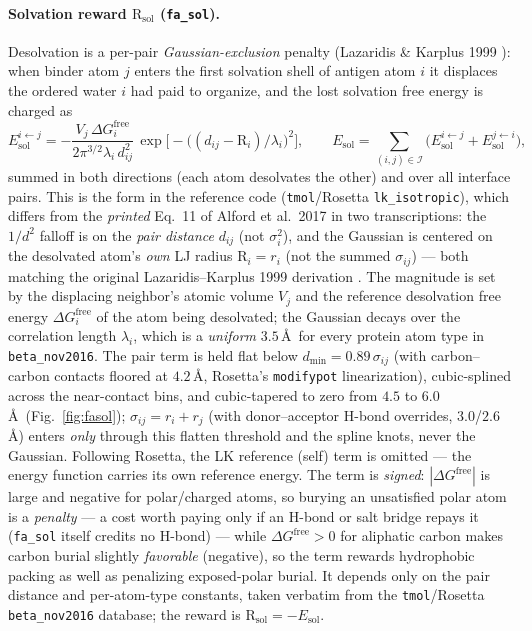 \documentclass[11pt]{article}
\newcommand{\R}{\mathrm{R}}
\newcommand{\ttk}[1]{\texttt{\small #1}}
\begin{document}
\paragraph{Solvation reward $\R_{\mathrm{sol}}$ (\ttk{fa\_sol}).} Desolvation is a per-pair
\emph{Gaussian-exclusion} penalty (Lazaridis \& Karplus 1999 \cite{lk1999}): when binder atom $j$
enters the first solvation shell of antigen atom $i$ it displaces the ordered water $i$ had paid to
organize, and the lost solvation free energy is charged as
\begin{equation}
E^{i\leftarrow j}_{\mathrm{sol}}=-\frac{V_j\,\Delta G^{\mathrm{free}}_i}
   {2\pi^{3/2}\lambda_i\,d_{ij}^{2}}\,
   \exp\!\Big[-\big((d_{ij}-\R_i)/\lambda_i\big)^{2}\Big],
\qquad
E_{\mathrm{sol}}=\!\!\sum_{(i,j)\in\mathcal I}\!\big(E^{i\leftarrow j}_{\mathrm{sol}}+E^{j\leftarrow i}_{\mathrm{sol}}\big),
\label{eq:fasol}
\end{equation}
summed in both directions (each atom desolvates the other) and over all interface pairs. This is the
form in the reference code (\ttk{tmol}/Rosetta \ttk{lk\_isotropic}), which differs from the
\emph{printed} Eq.~11 of Alford et al.\ 2017 \cite{alford2017} in two transcriptions: the $1/d^2$
falloff is on the \emph{pair distance} $d_{ij}$ (not $\sigma_i^2$), and the Gaussian is centered on the
desolvated atom's \emph{own} LJ radius $\R_i{=}r_i$ (not the summed $\sigma_{ij}$) --- both matching the
original Lazaridis--Karplus 1999 derivation \cite{lk1999}. The magnitude is set by the displacing
neighbor's atomic volume $V_j$ and the reference desolvation free energy $\Delta G^{\mathrm{free}}_i$ of
the atom being desolvated; the Gaussian decays over the correlation length $\lambda_i$, which is a
\emph{uniform} $3.5$\,\AA\ for every protein atom type in \ttk{beta\_nov2016}. The pair term is held
flat below $d_{\min}{=}0.89\,\sigma_{ij}$ (with carbon--carbon contacts floored at $4.2$\,\AA, Rosetta's
\ttk{modifypot} linearization), cubic-splined across the near-contact bins, and cubic-tapered to zero
from $4.5$ to $6.0$\,\AA\ (Fig.\ \ref{fig:fasol}); $\sigma_{ij}{=}r_i{+}r_j$ (with donor--acceptor
H-bond overrides, $3.0$/$2.6$\,\AA) enters \emph{only} through this flatten threshold and the spline
knots, never the Gaussian. Following Rosetta, the LK reference (self) term is omitted --- the energy
function carries its own reference energy. The term is \emph{signed}: $|\Delta G^{\mathrm{free}}|$ is
large and negative for polar/charged atoms, so burying an unsatisfied polar atom is a
\emph{penalty} --- a cost worth paying only if an H-bond or salt bridge repays it (\ttk{fa\_sol} itself
credits no H-bond) --- while $\Delta G^{\mathrm{free}}{>}0$ for aliphatic carbon makes carbon burial
slightly \emph{favorable} (negative), so the term rewards hydrophobic packing as well as penalizing
exposed-polar burial. It depends only on the pair distance and per-atom-type constants, taken verbatim
from the \ttk{tmol}/Rosetta \ttk{beta\_nov2016} database; the reward is $\R_{\mathrm{sol}}=-E_{\mathrm{sol}}$.
\end{document}
